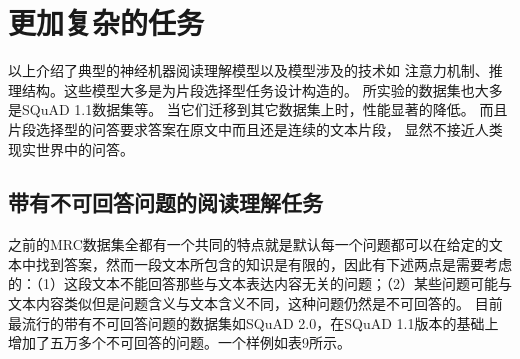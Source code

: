 \section{更加复杂的任务}
以上介绍了典型的神经机器阅读理解模型以及模型涉及的技术如
注意力机制、推理结构。这些模型大多是为片段选择型任务设计构造的。
所实验的数据集也大多是SQuAD 1.1数据集等。
当它们迁移到其它数据集上时，性能显著的降低。
而且片段选择型的问答要求答案在原文中而且还是连续的文本片段，
显然不接近人类现实世界中的问答。


\subsection{带有不可回答问题的阅读理解任务}\label{unknown}
之前的MRC数据集全都有一个共同的特点就是默认每一个问题都可以在给定的文本中找到答案，然而一段文本所包含的知识是有限的，因此有下述两点是需要考虑的：（1）这段文本不能回答那些与文本表达内容无关的问题；（2）某些问题可能与文本内容类似但是问题含义与文本含义不同，这种问题仍然是不可回答的。
目前最流行的带有不可回答问题的数据集如SQuAD 2.0，在SQuAD 1.1版本的基础上增加了五万多个不可回答的问题。一个样例如表9所示。

